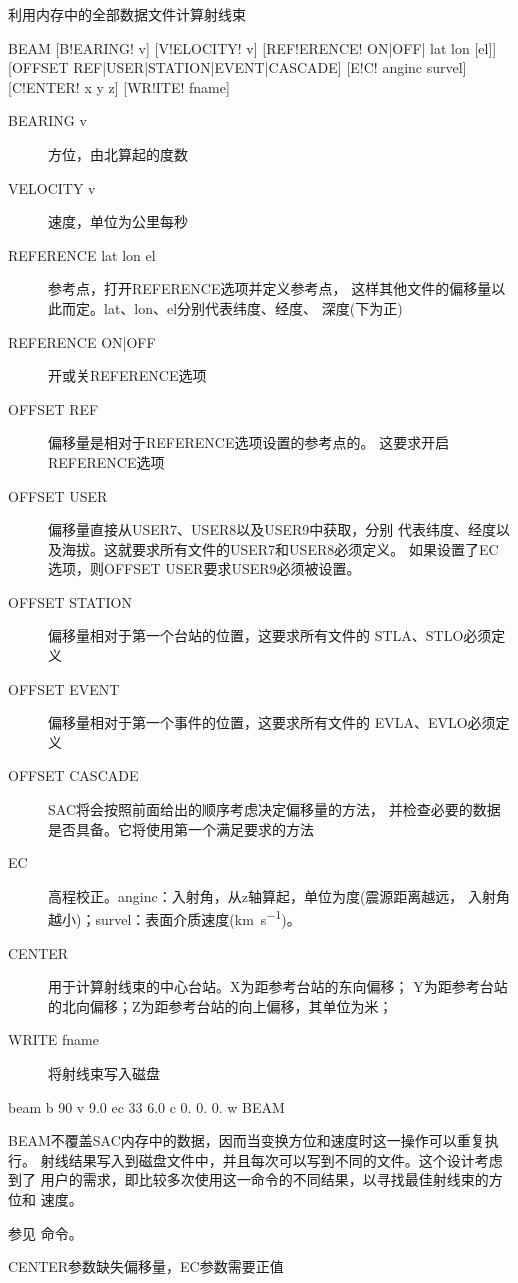 \label{cmd:beam}

利用内存中的全部数据文件计算射线束

\begin{SACSTX}
BEAM [B!EARING! v] [V!ELOCITY! v] [REF!ERENCE! ON|OFF| lat lon [el]]
    [OFFSET REF|USER|STATION|EVENT|CASCADE] [E!C! anginc survel]
    [C!ENTER! x y z] [WR!ITE! fname]
\end{SACSTX}

\begin{description}
\item [BEARING v] 方位，由北算起的度数
\item [VELOCITY v] 速度，单位为公里每秒
\item [REFERENCE lat lon el] 参考点，打开REFERENCE选项并定义参考点，
    这样其他文件的偏移量以此而定。lat、lon、el分别代表纬度、经度、
    深度(下为正)
\item [REFERENCE ON|OFF] 开或关REFERENCE选项
\item [OFFSET REF] 偏移量是相对于REFERENCE选项设置的参考点的。
    这要求开启REFERENCE选项
\item [OFFSET USER] 偏移量直接从USER7、USER8以及USER9中获取，分别
    代表纬度、经度以及海拔。这就要求所有文件的USER7和USER8必须定义。
    如果设置了EC选项，则OFFSET USER要求USER9必须被设置。
\item [OFFSET STATION] 偏移量相对于第一个台站的位置，这要求所有文件的
    STLA、STLO必须定义
\item [OFFSET EVENT] 偏移量相对于第一个事件的位置，这要求所有文件的
    EVLA、EVLO必须定义
\item [OFFSET CASCADE] SAC将会按照前面给出的顺序考虑决定偏移量的方法，
    并检查必要的数据是否具备。它将使用第一个满足要求的方法
\item [EC] 高程校正。anginc：入射角，从z轴算起，单位为度(震源距离越远，
    入射角越小)；survel：表面介质速度(\si{\km\per\s})。
\item [CENTER] 用于计算射线束的中心台站。X为距参考台站的东向偏移；
    Y为距参考台站的北向偏移；Z为距参考台站的向上偏移，其单位为米；
\item [WRITE fname] 将射线束写入磁盘
\end{description}

\begin{SACDFT}
beam  b 90  v 9.0 ec 33  6.0 c  0. 0. 0. w BEAM
\end{SACDFT}

BEAM不覆盖SAC内存中的数据，因而当变换方位和速度时这一操作可以重复执行。
射线结果写入到磁盘文件中，并且每次可以写到不同的文件。这个设计考虑到了
用户的需求，即比较多次使用这一命令的不同结果，以寻找最佳射线束的方位和
速度。

参见  命令。

CENTER参数缺失偏移量，EC参数需要正值
